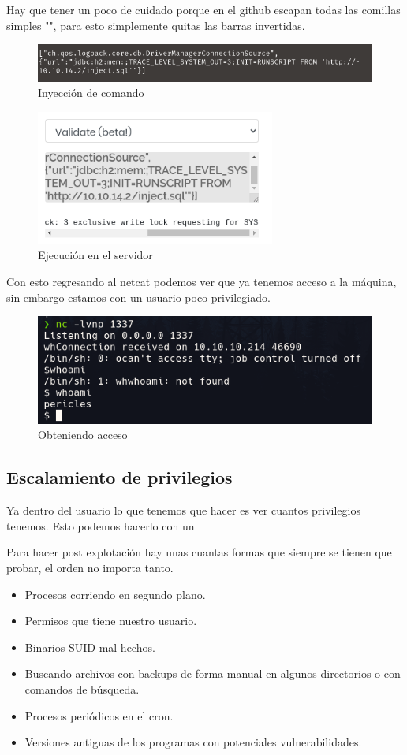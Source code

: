 \documentclass{article}
\begin{document}
Hay que tener un poco de cuidado porque en el github escapan todas las comillas simples "", para esto simplemente quitas las barras invertidas.
\begin{figure}[H]
	\center
	\includegraphics[width=\textwidth]{images/time/comando.png}
	\caption{Inyección de comando}
\end{figure}
\begin{figure}[H]
	\center
	\includegraphics[width=0.7\textwidth]{images/time/ejecucion.png}
	\caption{Ejecución en el servidor}
\end{figure}
Con esto regresando al netcat podemos ver que ya tenemos acceso a la máquina, sin embargo estamos con un usuario poco privilegiado.
\begin{figure}[H]
	\center
	\includegraphics[width=\textwidth]{images/time/acceso.png}
	\caption{Obteniendo acceso}
\end{figure}


\subsection{Escalamiento de privilegios}

Ya dentro del usuario lo que tenemos que hacer es ver cuantos privilegios tenemos. Esto podemos hacerlo con un 

Para hacer post explotación hay unas cuantas formas que siempre se tienen que probar, el orden no importa tanto.
\begin{itemize}
	\item Procesos corriendo en segundo plano.
	\item Permisos que tiene nuestro usuario.
	\item Binarios SUID mal hechos.
	\item Buscando archivos con backups de forma manual en algunos directorios o con comandos de búsqueda.
	\item Procesos periódicos en el cron.
	\item Versiones antiguas de los programas con potenciales vulnerabilidades.
\end{itemize}
\end{document}
